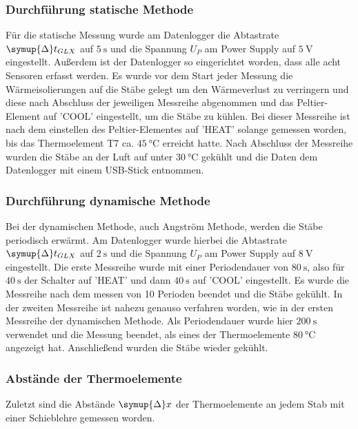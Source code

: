\subsubsection{Durchführung statische Methode}
Für die statische Messung wurde am Datenlogger die Abtastrate $\symup{\Delta}t_{GLX}$ auf $\SI{5}{\second}$ und die Spannung
$U_P$ am Power Supply auf $\SI{5}{\volt}$ eingestellt. Außerdem ist der Datenlogger so eingerichtet worden, dass alle acht Sensoren
erfasst werden. Es wurde vor dem Start jeder Messung die Wärmeisolierungen auf die Stäbe gelegt um den Wärmeverlust zu verringern
und diese nach Abschluss der jeweiligen Messreihe abgenommen und das Peltier-Element auf 'COOL' eingestellt, um die Stäbe zu kühlen.
Bei dieser Messreihe ist nach dem einstellen des Peltier-Elementes auf 'HEAT' solange gemessen worden, bis das
Thermoelement T7 ca. $\SI{45}{\celsius}$ erreicht hatte. Nach Abschluss der Messreihe wurden die Stäbe an der Luft
auf unter $\SI{30}{\celsius}$ gekühlt und die Daten dem Datenlogger mit einem USB-Stick entnommen.
\subsubsection{Durchführung dynamische Methode}
Bei der dynamischen Methode, auch Angström Methode, werden die Stäbe periodisch erwärmt.
Am Datenlogger wurde hierbei die Abtastrate $\symup{\Delta}t_{GLX}$ auf $\SI{2}{\second}$
und die Spannung $U_P$ am Power Supply auf $\SI{8}{\volt}$ eingestellt. Die erste Messreihe
wurde mit einer Periodendauer von $\SI{80}{\second}$, also für $\SI{40}{\second}$ der Schalter auf 'HEAT' und dann
$\SI{40}{\second}$ auf 'COOL' eingestellt. Es wurde die Messreihe nach dem messen von 10 Perioden beendet und die Stäbe gekühlt.
In der zweiten Messreihe ist nahezu genauso verfahren worden, wie in der ersten Messreihe der dynamischen Methode. Als Periodendauer wurde hier
$\SI{200}{\second}$ verwendet und die Messung beendet, als eines der Thermoelemente $\SI{80}{\celsius}$ angezeigt hat.
Anschließend wurden die Stäbe wieder gekühlt.
\subsubsection{Abstände der Thermoelemente}
Zuletzt sind die Abstände $\symup{\Delta}x$ der Thermoelemente an jedem Stab mit einer Schieblehre gemessen worden.